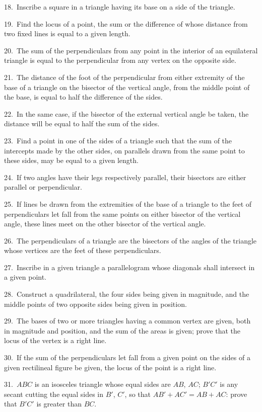 \documentclass[oneside]{book}
\begin{document}
\begin{footnotesize}
18.~Inscribe a square in a triangle having its base on a side of
the triangle.

19.~Find the locus of a point, the sum or the difference of
whose distance from two fixed lines is equal to a given length.

20.~The sum of the perpendiculars from any point in the
interior of an equilateral triangle is equal to the perpendicular from
any vertex on the opposite side.

21.~The distance of the foot of the perpendicular from either
extremity of the base of a triangle on the bisector of the vertical
angle, from the middle point of the base, is equal to half the
difference of the sides.

22.~In the same case, if the bisector of the external vertical
angle be taken, the distance will be equal to half the sum of the
sides.

23.~Find a point in one of the sides of a triangle such that the
sum of the intercepts made by the other sides, on parallels drawn
from the same point to these sides, may be equal to a given length.

24.~If two angles have their legs respectively parallel, their
bisectors are either parallel or perpendicular.

25.~If lines be drawn from the extremities of the base of a
triangle to the feet of perpendiculars let fall from the same points
on either bisector of the vertical angle, these lines meet on the
other bisector of the vertical angle.

26.~The perpendiculars of a triangle are the bisectors of the
angles of the triangle whose vertices are the feet of these
perpendiculars.

27.~Inscribe in a given triangle a parallelogram whose diagonals
shall intersect in a given point.

28.~Construct a quadrilateral, the four sides being given in
magnitude, and the middle points of two opposite sides being
given in position.

29.~The bases of two or more triangles having a common
vertex are given, both in magnitude and position, and the sum of the
areas is given; prove that the locus of the vertex is a right line.

30.~If the sum of the perpendiculars let fall from a given
point on the sides of a given rectilineal figure be given, the locus
of the point is a right line.

31.~$ABC$ is an isosceles triangle whose equal sides are $AB$, $AC$;
$B'C'$ is any secant cutting the equal sides in $B'$, $C'$, so that
$AB' + AC' = AB + AC$: prove that $B'C'$ is greater than $BC$.


\end{footnotesize}
\end{document}
